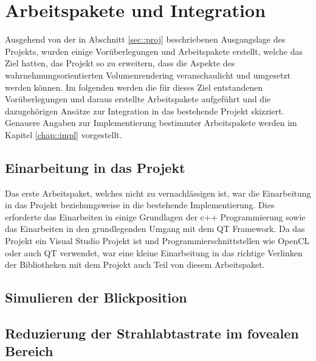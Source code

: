 \section{Arbeitspakete und Integration}\label{sec::workpacks}
Ausgehend von der in Abschnitt \ref{sec::proj} beschriebenen Ausgangslage des Projekts, wurden einige Vorüberlegungen und Arbeitspakete erstellt, welche das Ziel hatten, das Projekt so zu erweitern, dass die Aspekte des wahrnehmungsorientierten Volumenrendering veranschaulicht und umgesetzt werden können.
Im folgenden werden die für dieses Ziel entstandenen Vorüberlegungen und daraus erstellte Arbeitspakete aufgeführt und die dazugehörigen Ansätze zur Integration in das bestehende Projekt skizziert.
Genauere Angaben zur Implementierung bestimmter Arbeitspakete werden im Kapitel \ref{chap::impl} vorgestellt.

\subsection*{Einarbeitung in das Projekt}
Das erste Arbeitspaket, welches nicht zu vernachlässigen ist, war die Einarbeitung in das Projekt beziehungsweise in die bestehende Implementierung.
Dies erforderte das Einarbeiten in einige Grundlagen der c++ Programmierung sowie das Einarbeiten in den grundlegenden Umgang mit dem QT Framework.
Da das Projekt ein Visual Studio Projekt ist und Programmierschnittstellen wie OpenCL oder auch QT verwendet, war eine kleine Einarbeitung in das richtige Verlinken der Bibliotheken mit dem Projekt auch Teil von diesem Arbeitspaket.

\subsection*{Simulieren der Blickposition}

\subsection*{Reduzierung der Strahlabtastrate im fovealen Bereich}


